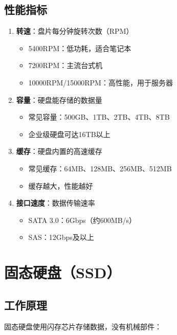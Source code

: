 \documentclass[12pt,UTF8]{ctexbook}
\begin{document}
\section{性能指标}

\begin{enumerate}
    \item \textbf{转速}：盘片每分钟旋转次数（RPM）
    \begin{itemize}[leftmargin=2em]
        \item 5400RPM：低功耗，适合笔记本
        \item 7200RPM：主流台式机
        \item 10000RPM/15000RPM：高性能，用于服务器
    \end{itemize}
    
    \item \textbf{容量}：硬盘能存储的数据量
    \begin{itemize}[leftmargin=2em]
        \item 常见容量：500GB、1TB、2TB、4TB、8TB
        \item 企业级硬盘可达16TB以上
    \end{itemize}
    
    \item \textbf{缓存}：硬盘内置的高速缓存
    \begin{itemize}[leftmargin=2em]
        \item 常见缓存：64MB、128MB、256MB、512MB
        \item 缓存越大，性能越好
    \end{itemize}
    
    \item \textbf{接口速度}：数据传输速率
    \begin{itemize}[leftmargin=2em]
        \item SATA 3.0：6Gbps（约600MB/s）
        \item SAS：12Gbps及以上
    \end{itemize}
\end{enumerate}

\chapter{固态硬盘（SSD）}

\section{工作原理}

固态硬盘使用闪存芯片存储数据，没有机械部件：
\end{document}
